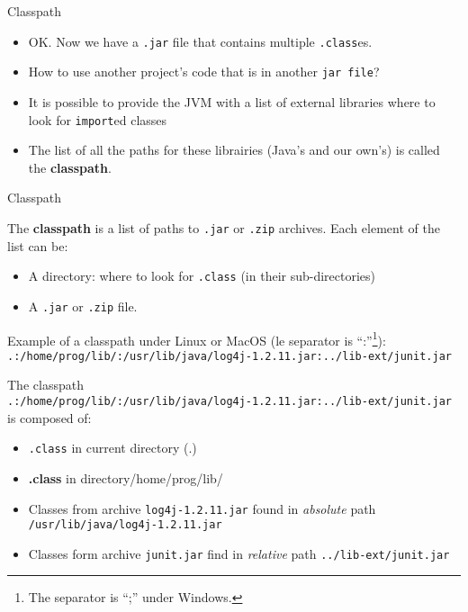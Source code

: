 \documentclass[English,c,%
hyperref={%
    pdftitle={FISA-DE2 OOP in Java},%
    pdfauthor={Muller, Gravier, Laforest, Subercaze},%
    pdfsubject={OOP in Java},%
    pdfkeywords={OOP, Java}%
    },%
xcolor={pdftex,svgnames} %
]{beamer}
\begin{document}
\begin{frame}{Classpath}
\begin{itemize}
    \item OK. Now we have a \texttt{.jar} file that contains multiple \texttt{.class}es.
    \item How to use another project's code that is in another \texttt{jar file}?
    \item It is possible to provide the JVM with a list of external libraries where to look for \texttt{import}ed classes
    \item The list of all the paths for these librairies (Java's and our own's) is called the \textbf{classpath}.
\end{itemize}
\end{frame}


\begin{frame}{Classpath}

  The \textbf{classpath} is a list of paths to \texttt{.jar} or
  \texttt{.zip} archives. Each element of the list can be:
\begin{itemize}
    \item A directory: where to look for \texttt{.class} (in their sub-directories)
    \item A \texttt{.jar} or \texttt{.zip} file.
  \end{itemize}

Example of a classpath under Linux or MacOS (le separator is ``:''\footnote{The separator is ``;'' under Windows.}):\\
{\footnotesize \texttt{.:/home/prog/lib/:/usr/lib/java/log4j-1.2.11.jar:../lib-ext/junit.jar}}
\end{frame}


\begin{frame}{}
The classpath\\
{\footnotesize \texttt{.:/home/prog/lib/:/usr/lib/java/log4j-1.2.11.jar:../lib-ext/junit.jar}}
is composed of:
\begin{itemize}
    \item \texttt{.class} in current directory  (.)
    \item \textbf{.class} in directory/home/prog/lib/
    \item Classes from archive \texttt{log4j-1.2.11.jar} found in
    \textit{absolute} path \texttt{/usr/lib/java/log4j-1.2.11.jar}
    \item Classes form archive \texttt{junit.jar} find in
    \textit{relative} path \texttt{../lib-ext/junit.jar}
\end{itemize}
\end{frame}
\end{document}
